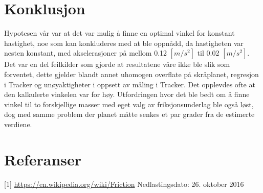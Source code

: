 \documentclass[10pt,a4paper]{report}
\begin{document}
{\let\clearpage\relax\chapter*{Konklusjon}}
Hypotesen vår var at det var mulig å finne en optimal vinkel for konstant hastighet, noe som kan konkluderes med at ble oppnådd, da hastigheten var nesten konstant, med akselerasjoner på mellom 0.12 $[m/s^2]$ til 0.02 $[m/s^2]$. Det var en del feilkilder som gjorde at resultatene våre ikke ble slik som forventet, dette gjelder blandt annet uhomogen overflate på skråplanet, regresjon i Tracker og unøyaktigheter i oppsett av måling i Tracker. Det opplevdes ofte at den kalkulerte vinkelen var for høy. Utfordringen hvor det ble bedt om å finne vinkel til to forskjellige masser med eget valg av friksjonsunderlag ble også løst, dog med samme problem der planet måtte senkes et par grader fra de estimerte verdiene.

\chapter*{Referanser}
[1] \href{url}{https://en.wikipedia.org/wiki/Friction}
Nedlastingsdato: 26. oktober 2016
\end{document}
